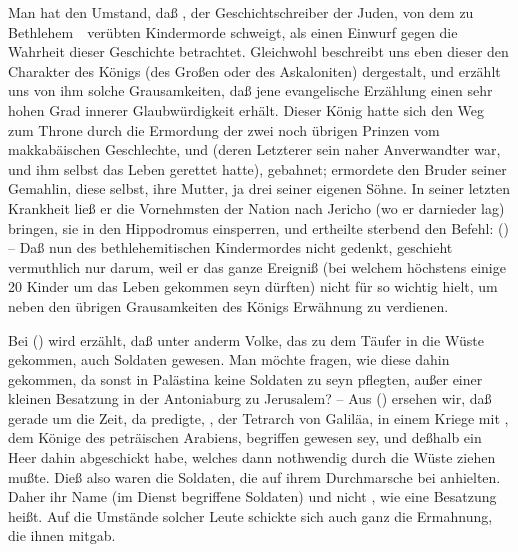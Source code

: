 \begin{aufza}
\begin{aufzb}
\end{aufzb}
\item {}
\begin{aufzb}
\item Man hat den Umstand, daß , der Geschichtschreiber der Juden, von dem zu Bethlehem~\ verübten Kindermorde schweigt, als einen Einwurf gegen die Wahrheit dieser Geschichte betrachtet. Gleichwohl beschreibt uns eben dieser  den Charakter des Königs  (des Großen oder des Askaloniten) dergestalt, und erzählt uns von ihm solche Grausamkeiten, daß jene evangelische Erzählung einen sehr hohen Grad innerer Glaubwürdigkeit erhält. Dieser König hatte sich den Weg zum Throne durch die Ermordung der zwei noch übrigen Prinzen vom makkabäischen Geschlechte,  und  (deren Letzterer sein naher Anverwandter war, und ihm selbst das Leben gerettet hatte), gebahnet; ermordete den Bruder seiner Gemahlin, diese selbst, ihre Mutter, ja drei seiner eigenen Söhne. In seiner letzten Krankheit ließ er die Vornehmsten der Nation nach Jericho (wo er darnieder lag) bringen, sie in den Hippodromus einsperren, und ertheilte sterbend den Befehl:  () -- Daß nun  des bethlehemitischen Kindermordes nicht gedenkt, geschieht vermuthlich nur darum, weil er das ganze Ereigniß (bei welchem höchstens einige 20 Kinder um das Leben gekommen seyn dürften) nicht für so wichtig hielt, um neben den übrigen Grausamkeiten des Königs Erwähnung zu verdienen.
\item Bei  () wird erzählt, daß unter anderm Volke, das zu  dem Täufer in die Wüste gekommen, auch Soldaten gewesen. Man möchte fragen, wie diese dahin gekommen, da sonst in Palästina keine Soldaten zu seyn pflegten, außer einer kleinen Besatzung in der Antoniaburg zu Jerusalem? -- Aus  () ersehen wir, daß gerade um die Zeit, da  predigte, , der Tetrarch von Galiläa, in einem Kriege mit , dem Könige des peträischen Arabiens, begriffen gewesen sey, und deßhalb ein Heer dahin abgeschickt habe, welches dann nothwendig durch die Wüste ziehen mußte. Dieß also waren die Soldaten, die auf ihrem Durchmarsche bei  anhielten. Daher ihr Name  (im Dienst begriffene Soldaten) und nicht , wie eine Besatzung heißt. Auf die Umstände solcher Leute schickte sich auch ganz die Ermahnung, die ihnen  mitgab.

\end{aufzb}
\end{aufza}
